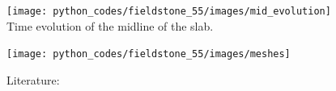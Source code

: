 \begin{center}
\texttt{[image: python\_codes/fieldstone\_55/images/mid\_evolution]}\\
{\captionfont Time evolution of the midline of the slab.}
\end{center}


\begin{center}
\texttt{[image: python\_codes/fieldstone\_55/images/meshes]}
\end{center}


\vspace{3cm}






Literature: \cite{fogm14}
